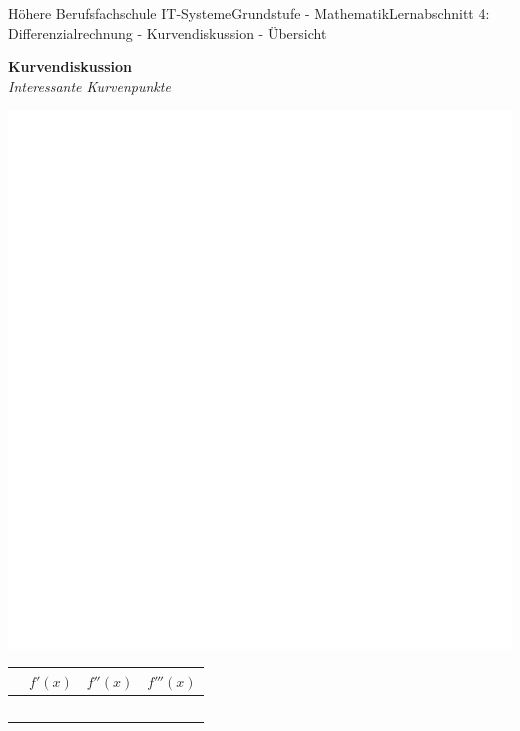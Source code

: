 \documentclass[oneside,openany,headings=optiontotoc,11pt,numbers=noenddot]{scrreprt}
\begin{document}
	\begin{worksheet}{Höhere Berufsfachschule IT-Systeme}{Grundstufe - Mathematik}{Lernabschnitt 4: Differenzialrechnung - Kurvendiskussion - Übersicht}
		\begin{framed}
			\begin{center}
				\textbf{Kurvendiskussion}\\
				\textit{Interessante Kurvenpunkte}
			\end{center}
			\raggedright
			\includegraphics[scale=0.1]{../../empty.jpg}
			\begin{tabularx}{\textwidth}{|X|X|X|X|}
				\hline
				\rowcolor{gray!15} \multicolumn{1}{|c|}{\(f(x)\)} & \multicolumn{1}{c|}{\(f'(x)\)} & \multicolumn{1}{c|}{\(f''(x)\)} & \multicolumn{1}{c|}{\(f'''(x)\)}\\
				\hline
				\hline
				\rule{0pt}{80pt} & \cellcolor{gray!15} & \cellcolor{gray!15} & \cellcolor{gray!15}\\
				\hline
				\rule{0pt}{80pt} & & & \cellcolor{gray!15}\\
				\hline
				\rule{0pt}{80pt} & & & \cellcolor{gray!15}\\
				\hline
				\rule{0pt}{80pt} & & &\\
				\hline
				\rule{0pt}{80pt} & & &\\
				\hline
			\end{tabularx}
		\end{framed}
	\end{worksheet}
\end{document}
